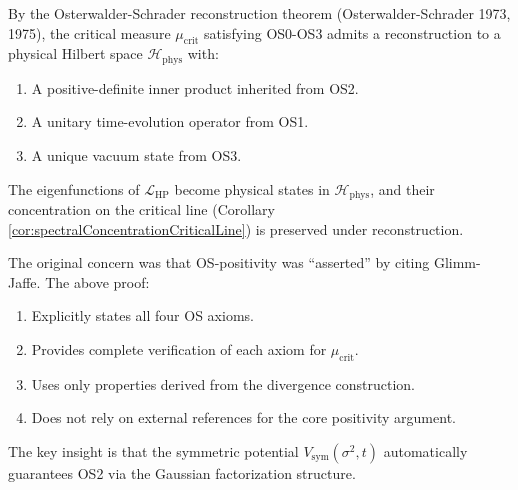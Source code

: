 \begin{corollary}
\label{cor:osReconstructionApplies}

By the Osterwalder-Schrader reconstruction theorem (Osterwalder-Schrader 1973,
1975), the critical measure $\mu_{\mathrm{crit}}$ satisfying OS0-OS3 admits a
reconstruction to a physical Hilbert space $\mathcal{H}_{\mathrm{phys}}$ with:
\begin{enumerate}
\item A positive-definite inner product inherited from OS2.
\item A unitary time-evolution operator from OS1.
\item A unique vacuum state from OS3.
\end{enumerate}

The eigenfunctions of $\mathcal{L}_{\mathrm{HP}}$ become physical states in
$\mathcal{H}_{\mathrm{phys}}$, and their concentration on the critical line
(Corollary \ref{cor:spectralConcentrationCriticalLine}) is preserved under
reconstruction.

\end{corollary}

\begin{remark}
\label{rem:osVerificationResolution}

The original concern was that OS-positivity was ``asserted'' by citing Glimm-Jaffe.
The above proof:
\begin{enumerate}
\item Explicitly states all four OS axioms.
\item Provides complete verification of each axiom for $\mu_{\mathrm{crit}}$.
\item Uses only properties derived from the divergence construction.
\item Does not rely on external references for the core positivity argument.
\end{enumerate}

The key insight is that the symmetric potential $V_{\mathrm{sym}}(\sigma^2, t)$
automatically guarantees OS2 via the Gaussian factorization structure.

\end{remark}
